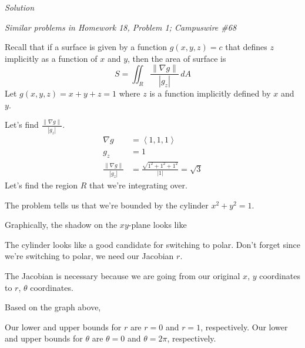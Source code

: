 \documentclass{article}
\newcommand{\lra}[1]{\left\langle #1 \right\rangle}
\newcommand{\norm}[1]{\left\lVert #1 \right\rVert}
\newcommand{\Solution}{\textit{Solution}}
\begin{document}
\Solution

\textit{Similar problems in Homework 18, Problem 1; Campuswire \#68}

Recall that if a surface is given by a function $g(x,y,z)=c$ that defines $z$ implicitly as a function of $x$ and $y$, then the area of surface is
\begin{equation*}
    S=\iint_R \frac{\norm{\nabla g}}{\left| g_z\right|}\,dA
\end{equation*}
Let $g(x,y,z)=x+y+z=1$ where $z$ is a function implicitly defined by $x$ and $y$.

Let's find $\displaystyle \frac{\norm{\nabla g}}{\left|g_z\right|}$.
\begin{align*}
    \nabla g &= \lra{1,1,1}\\
    g_z &= 1\\
    \frac{\norm{\nabla g}}{\left|g_z\right|}&=\frac{\sqrt{1^2+1^2+1^2}}{\left|1\right|}=\sqrt{3}
\end{align*}
Let's find the region $R$ that we're integrating over.

The problem tells us that we're bounded by the cylinder $x^2+y^2=1$.

Graphically, the shadow on the $xy$-plane looks like
 \begin{center}
\end{center}
The cylinder looks like a good candidate for switching to polar. Don't forget since we’re switching to
polar, we need our Jacobian $r$.

The Jacobian is necessary because we are going from our original $x$, $y$ coordinates to $r$, $\theta$ coordinates.

Based on the graph above,

Our lower and upper bounds for $r$ are $r=0$ and $r=1$, respectively.
Our lower and upper bounds for $\theta$ are $\theta=0$ and $\theta=2\pi$, respectively.
\end{document}

